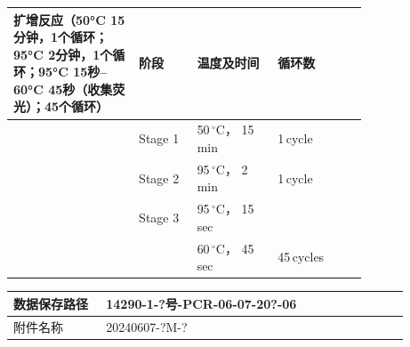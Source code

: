 \documentclass[UTF8,10pt,a4paper,fontset=fandol]{ctexart}
\newcommand{\fieldvalue}[1]{#1}
\newcommand{\handwritten}[1]{#1}
\begin{document}
\begin{tabular}{|p{0.28\linewidth}|p{0.13\linewidth}|p{0.18\linewidth}|p{0.20\linewidth}|}
\hline
扩增反应（50°C 15分钟，1个循环；95°C 2分钟，1个循环；95°C 15秒--60°C 45秒（收集荧光）；45个循环） &
阶段 & 温度及时间 & 循环数 \\ \hline
& Stage 1 &
\fieldvalue{\handwritten{50}}\,${}^{\circ}\mathrm{C}$，
\fieldvalue{\handwritten{15}}\,min &
\fieldvalue{\handwritten{1}}\,cycle \\ \hline
& Stage 2 &
\fieldvalue{\handwritten{95}}\,${}^{\circ}\mathrm{C}$，
\fieldvalue{\handwritten{2}}\,min &
\fieldvalue{\handwritten{1}}\,cycle \\ \hline
& Stage 3 &
\fieldvalue{\handwritten{95}}\,${}^{\circ}\mathrm{C}$，
\fieldvalue{\handwritten{15}}\,sec &
\\[-1mm]
& &
\fieldvalue{\handwritten{60}}\,${}^{\circ}\mathrm{C}$，
\fieldvalue{\handwritten{45}}\,sec &
\fieldvalue{\handwritten{45}}\,cycles \\ \hline
\end{tabular}

\vspace{2mm}

\begin{tabular}{|p{0.22\linewidth}|p{0.72\linewidth}|}
\hline
数据保存路径 &
\fieldvalue{\handwritten{14290-1-?号-PCR-06-07-20?-06}} \\ \hline
附件名称 &
\fieldvalue{\handwritten{20240607-?M-?}} \\ \hline
\end{tabular}
\end{document}

